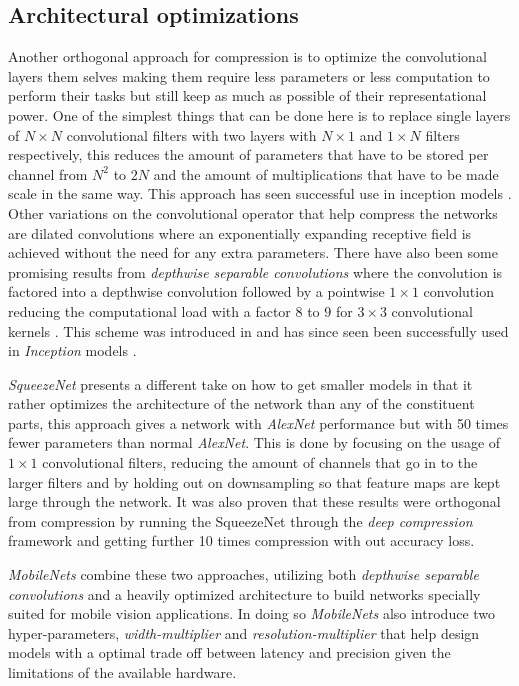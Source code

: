 \documentclass[11pt]{article}
\newcommand{\bibentry}[1]{\cite{#1}}
\begin{document}
\subsection*{Architectural optimizations}
\label{sec:org42de89d}
Another orthogonal approach for compression is to optimize the convolutional layers them selves making them require less parameters or less computation to perform their tasks but still keep as much as possible of their representational power. One of the simplest things that can be done here is to replace single layers of \(N \times N\) convolutional filters with two layers with \(N \times 1\) and \(1 \times N\) filters respectively, this reduces the amount of parameters that have to be stored per channel from \(N^2\) to \(2N\) and the amount of multiplications that have to be made scale in the same way. This approach has seen successful use in inception models \bibentry{szegedy2016rethinking}. 
Other variations on the convolutional operator that help compress the networks are dilated convolutions \bibentry{yu2015multi} where an exponentially expanding receptive field is achieved without the need for any extra parameters. There have also been some promising results from \emph{depthwise separable convolutions} where the convolution is factored into a depthwise convolution followed by a pointwise \(1 \times 1\) convolution reducing the computational load with a factor \(8\) to \(9\) for \(3 \times 3\) convolutional kernels \bibentry{howard2017mobilenets}. This scheme was introduced in \bibentry{sifre2014rigid} and has since seen been successfully used in \emph{Inception} models \bibentry{ioffe2015batch}. 

\emph{SqueezeNet} \bibentry{iandola2016squeezenet} presents a different take on how to get smaller models in that it rather optimizes the architecture of the network than any of the constituent parts, this approach gives a network with \emph{AlexNet} performance but with 50 times fewer parameters than normal \emph{AlexNet}. This is done by focusing on the usage of \(1 \times 1\) convolutional filters, reducing the amount of channels that go in to the larger filters and by holding out on downsampling so that feature maps are kept large through the network. It was also proven that these results were orthogonal from compression by running the SqueezeNet through the \emph{deep compression} framework \bibentry{han2015deep} and getting further 10 times compression with out accuracy loss.

\emph{MobileNets} \bibentry{howard2017mobilenets} combine these two approaches, utilizing both \emph{depthwise separable convolutions} and a heavily optimized architecture to build networks specially suited for mobile vision applications. In doing so \emph{MobileNets} also introduce two hyper-parameters, \emph{width-multiplier} and \emph{resolution-multiplier} that help design models with a optimal trade off between latency and precision given the limitations of the available hardware.


 
\end{document}
